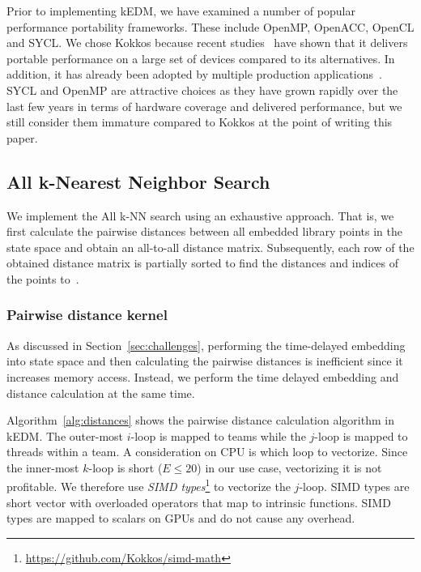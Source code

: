 \documentclass[conference]{IEEEtran}
\begin{document}
Prior to implementing kEDM, we have examined a number of popular performance
portability frameworks. These include OpenMP, OpenACC, OpenCL and SYCL\@. We
chose Kokkos  because recent studies~\cite{Martineau2017, Deakin2019, Deakin2020}
have shown that it delivers portable performance on a large set of devices
compared to its alternatives. In addition, it has already been adopted by
multiple production applications~\cite{Sprague2020,Holmen2017,Demeshko2019}.
SYCL and OpenMP are attractive choices as they have grown rapidly over the
last few years in terms of hardware coverage and delivered performance, but we
still consider them immature compared to Kokkos at the point of writing this
paper.

\subsection{All k-Nearest Neighbor Search}

We implement the All k-NN search using an exhaustive approach. That is, we
first calculate the pairwise distances between all embedded library points in
the state space and obtain an all-to-all distance matrix. Subsequently, each
row of the obtained distance matrix is partially sorted to find the distances
and indices of the points
to~\cite{Garcia2008,Garcia2010}.

\cite{Johnson2019}
\cite{Shanbhag2018}

\subsubsection{Pairwise distance kernel}
As discussed in Section~\ref{sec:challenges}, performing the time-delayed
embedding into state space and then calculating the pairwise distances is
inefficient since it increases memory access. Instead, we perform the time
delayed embedding and distance calculation at the same time.

Algorithm~\ref{alg:distances} shows the pairwise distance calculation
algorithm in kEDM\@. The outer-most $i$-loop is mapped to teams while the
$j$-loop is mapped to threads within a team. A consideration on CPU is which
loop to vectorize. Since the inner-most $k$-loop is short ($E \leq 20$) in our
use case, vectorizing it is not profitable. We therefore use \textit{SIMD
types}\footnote{\url{https://github.com/Kokkos/simd-math}} to vectorize the
$j$-loop. SIMD types are short vector with overloaded operators that map to
intrinsic functions. SIMD types are mapped to scalars on GPUs and do not cause
any overhead.
\end{document}
